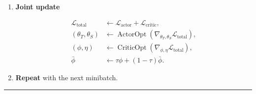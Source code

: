 \documentclass[11pt]{article}
\newcommand{\sg}{\operatorname{stopgrad}}
\newcommand{\mean}{\operatorname{mean}}
\newcommand{\clip}{\operatorname{clip}}
\begin{document}
\begin{enumerate}
\begin{align*}
\epsilon_d &\sim\mathcal N(0,I),
&
a_{\mathrm{teacher}}
    &\leftarrow
      \sg\!\left(
        \operatorname{Euler}^{10}_{1\rightarrow0}
        (v_{\theta_T};o,h,\epsilon_d)
      \right),
\\
a_{\mathrm{student}}
    &\leftarrow \pi_{\theta_S}(o,h,\epsilon_d,0),
&
\mathcal L_{\mathrm{distill}}
    &\leftarrow \mean\!\left[
      \left\|a_{\mathrm{student}}-a_{\mathrm{teacher}}\right\|_2^2
      \right],
\\
\mathcal L_{Q,\mathrm{actor}}
    &\leftarrow
      -\mean_i\!\left[
        Q_{\sg(\phi),i}
        \!\left(o,h,\clip(a_{\mathrm{student}},-1,1)\right)
      \right],
&
\mathcal L_{\mathrm{actor}}
    &\leftarrow
      \mathcal L_{\mathrm{flow}}
      +\alpha\mathcal L_{\mathrm{distill}}
      +\mathcal L_{Q,\mathrm{actor}}.
\end{align*}

\item \textbf{Joint update}

\begin{align*}
\mathcal L_{\mathrm{total}}
    &\leftarrow \mathcal L_{\mathrm{actor}}
      +\mathcal L_{\mathrm{critic}},
\\
(\theta_T,\theta_S)
    &\leftarrow
      \operatorname{ActorOpt}\!\left(
      \nabla_{\theta_T,\theta_S}\mathcal L_{\mathrm{total}}
      \right),
\\
(\phi,\eta)
    &\leftarrow
      \operatorname{CriticOpt}\!\left(
      \nabla_{\phi,\eta}\mathcal L_{\mathrm{total}}
      \right),
\\
\bar\phi
    &\leftarrow \tau\phi+(1-\tau)\bar\phi.
\end{align*}

\item \textbf{Repeat} with the next minibatch.

\end{enumerate}

\medskip
\hrule
\end{document}
